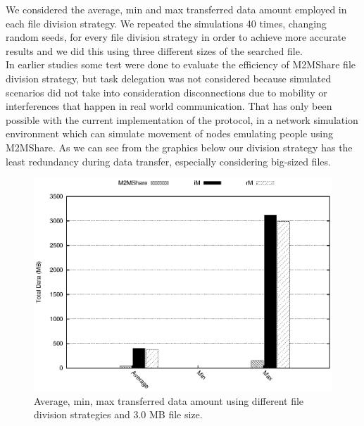 We considered the average, min and max transferred data amount employed in each file division strategy. We repeated the simulations 40 times, changing random seeds, for every file division strategy in order to achieve more accurate results and we did this using three different sizes of the searched file. 
\\
In earlier studies some test were done to evaluate the efficiency of M2MShare file division strategy, but task delegation was not considered because simulated scenarios did not take into consideration disconnections due to mobility or interferences that happen in real world
communication. That has only been possible with the current implementation of the protocol, in a network simulation environment which can simulate movement of nodes emulating people using M2MShare.
As we can see from the graphics below our division strategy has the least redundancy during data transfer, especially considering big-sized files.

\begin{figure}[htpb]
  \begin{center}
    \includegraphics[scale=1]{grafici/dataDFS_3MB.eps}
    \caption{Average, min, max transferred data amount using different file division strategies and 3.0 MB file size.}
    \label{graficoDataFDS_3MB}
  \end{center}
\end{figure}

